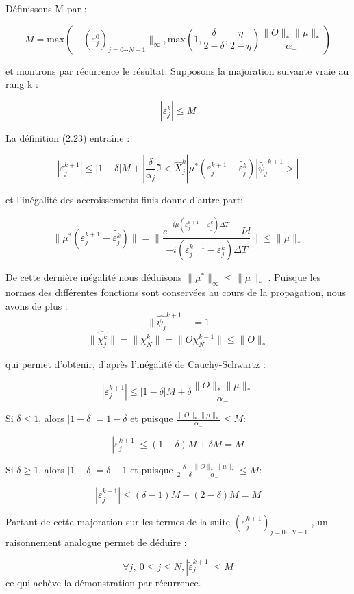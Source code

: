 \begin{ proof }
	Définissons M par :
	
	\begin{equation}
	M = \text{max}(\lVert (\tilde{\varepsilon^0_j})_{j=0\cdots N-1}\lVert_{\infty}, \text{max}(1,\frac{\delta}{2-\delta}, \frac{\eta}{2-\eta})\frac{\lVert O \rVert_* \lVert \mu \rVert_* }{\alpha_-} )
	\end{equation}
	
	et montrons par récurrence le résultat. Supposons la majoration suivante vraie au rang k :
	
	$$ |\tilde{\varepsilon^k_j}| \leq M $$
	
	La définition (2.23) entraîne :
	
	$$ |\varepsilon_j^{k+1}| \leq |1-\delta|M + |\frac{\delta}{\alpha_j} \Im < \hat{X}^k_j| \mu^* ( \varepsilon_j^{k+1} - \tilde{\varepsilon^k_j})| \tilde{\psi_j}^{k+1} >|  $$
	
	et l'inégalité des accroissements finis donne d’autre part:
	
	$$ \lVert \mu^* ( \varepsilon_j^{k+1} - \tilde{\varepsilon^k_j}) \rVert = \lVert \frac{e^{-i \mu( \varepsilon_j^{k+1} - \tilde{\varepsilon^k_j})\Delta T}-Id}{-i ( \varepsilon_j^{k+1} - \tilde{\varepsilon^k_j})\Delta T} \rVert \leq \lVert \mu \rVert_*  $$
	
	De cette dernière inégalité nous déduisons $ \lVert \mu^* \rVert_{\infty} \leq  \lVert \mu \rVert_*  $ . Puisque les normes des différentes fonctions sont conservées au cours de la propagation, nous avons de plus :
	$$ \lVert \hat{\psi_j}^{k+1} \rVert = 1  $$
	$$ \lVert \hat{\chi^k_j} \rVert = \lVert \chi^k_N \rVert = \lVert O \chi_N^{k-1}\rVert \leq \lVert O \rVert_* $$
	
	qui permet d'obtenir, d’après l'inégalité de Cauchy-Schwartz :
	
	$$ |\varepsilon_j^{k+1} | \leq |1-\delta|M + \delta \frac{\lVert O \rVert_* \lVert \mu \rVert_* }{\alpha_-} $$
	
	Si $\delta \leq 1$, alors $|1-\delta| = 1-\delta$ et puisque $\frac{\lVert O \rVert_* \lVert \mu \rVert_* }{\alpha_-} \leq M$:
	
	$$ |\varepsilon_j^{k+1} | \leq (1-\delta)M + \delta M = M $$
	
	Si $\delta \geq 1$, alors $|1-\delta| = \delta - 1$ et puisque $\frac{\delta}{2-\delta} \frac{\lVert O \rVert_* \lVert \mu \rVert_* }{\alpha_-} \leq M$:
	
	$$ |\varepsilon_j^{k+1} | \leq (\delta-1)M + (2-\delta) M = M $$
	
	Partant de cette majoration sur les termes de la suite $ (\varepsilon_j^{k+1})_{j=0\cdots N-1} $ , un raisonnement analogue permet de déduire :
	
	$$ \forall j,\ 0 \leq j \leq N, |\tilde{\varepsilon}_j^{k+1} | \leq M $$
	ce qui achève la démonstration par récurrence.
\end{ proof }

